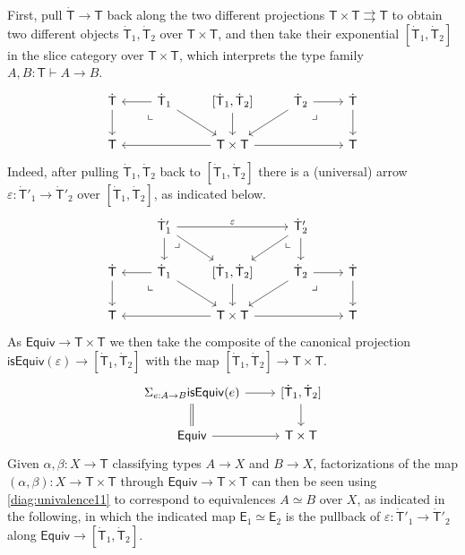 \documentclass[12pt,reqno]{amsart}
\renewcommand{\to}{\ensuremath{\rightarrow}}
\newcommand{\tto}{\ensuremath{\rightrightarrows}}
\newcommand{\T}{\ensuremath{\mathsf{T}}}
\newcommand{\TT}{\ensuremath{\dot{\mathsf{T}}}}
\newcommand{\pbcorner}{\arrow[dr,phantom,"\lrcorner" very near start, shift right=.5ex]} %
\newcommand{\pbcornerright}{\arrow[dl,phantom,"\llcorner" very near start, shift left=.5ex]} %
\theoremstyle{remark}
\theoremstyle{definition}
\begin{document}
First, pull $\TT \to \T$ back along the two different projections $\T \times \T \tto \T$ to obtain two different objects $\TT_1, \TT_2$ over $\T \times \T$, and then take their exponential $[\TT_1, \TT_2]$ in the slice category over ${\T \times \T}$, which interprets the type family $A, B : \T \vdash A \to B$.
\begin{equation*}\label{diag:univalence1}
\begin{tikzcd} 
	\TT \ar[d] & \TT_1 \ar[l] \ar[rd] \pbcornerright &\ar[d] [\TT_1, \TT_2] & \TT_2 \ar[ld] \ar[r] \pbcorner & \TT \ar[d] \\  
	\T && \ar[ll]  \T \times \T \ar[rr] && \T
	 \end{tikzcd}
 \end{equation*}
 Indeed, after pulling $\TT_1, \TT_2$ back to $[\TT_1, \TT_2]$ there is a (universal) arrow $\varepsilon : \TT'_1 \to \TT'_2$ over $[\TT_1, \TT_2]$, as indicated below.
 \begin{equation}\label{diag:univalence11}
\begin{tikzcd} 
& \TT'_1  \ar[d] \arrow[dr,phantom,"\lrcorner" very near start, shift right=1.5ex] \ar[rd] \ar[rr,"\varepsilon"] 
	&& \TT'_2 \ar[ld]  \arrow[dl,phantom,"\llcorner" very near start, shift left=1.5ex] \ar[d] & \\  
	\TT \ar[d] & \TT_1 \ar[l] \ar[rd] \pbcornerright &\ar[d] [\TT_1, \TT_2]& \TT_2 \ar[ld] \ar[r] \pbcorner & \TT \ar[d] \\  
	\T && \ar[ll]  \T \times \T \ar[rr] && \T
	 \end{tikzcd}
 \end{equation}
%
As $\mathsf{Equiv} \to \T \times \T$ we then take the composite of the canonical projection $\mathsf{isEquiv}(\varepsilon) \to [\TT_1, \TT_2]$ with the map $[\TT_1, \TT_2] \to  \T \times \T$.
%
\begin{equation*}\label{diag:univalence2}
\begin{tikzcd} 
{\Sigma_{e : A\to B}\mathsf{isEquiv}(e)}  \ar[d, equals] \ar[r] & {[\TT_1, \TT_2]}  \ar[d]\\
\mathsf{Equiv} \ar[r] &  \T \times \T
 \end{tikzcd}
 \end{equation*}
%
Given $\alpha, \beta : X \to \T$ classifying types $A\to X$ and $B \to X$, factorizations of the map $(\alpha, \beta) : X \to \T \times \T $ through $\mathsf{Equiv} \to \T \times \T$ can then be seen using \eqref{diag:univalence11}  to correspond to equivalences $A\simeq B$ over $X$, as indicated in the following, in which the indicated map $\mathsf{E}_1\simeq\mathsf{E}_2$ is the pullback of  $\varepsilon : \TT'_1\to \TT'_2$ along $\mathsf{Equiv}\to {[\TT_1, \TT_2]}$.
\end{document}
